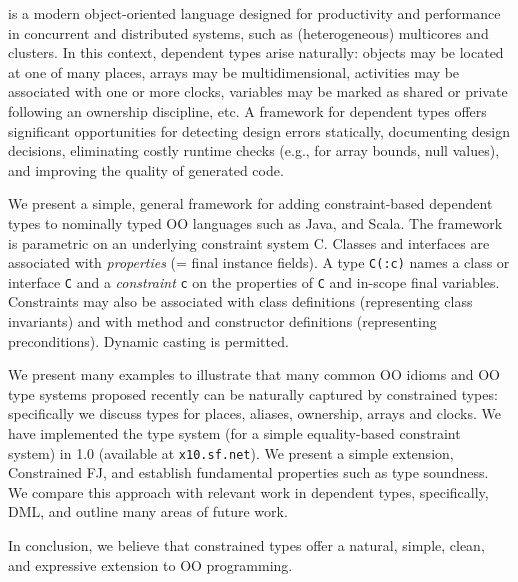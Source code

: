 \Xten{} is a modern object-oriented language designed for productivity
and performance in concurrent and distributed systems, such as
(heterogeneous) multicores and clusters. In this context, dependent
types arise naturally: objects may be located at one of many places,
arrays may be multidimensional, activities may be associated with one
or more clocks, variables may be marked as shared or private following
an ownership discipline, etc.  A framework for dependent types offers
significant opportunities for detecting design errors statically,
documenting design decisions, eliminating costly runtime checks
(e.g., for array bounds, null values), and improving the quality of
generated code.

We present a simple, general framework for adding constraint-based
dependent types to nominally typed OO languages such as Java, \Xten{}
and Scala. The framework is parametric on an underlying constraint
system {\cal C}. Classes and interfaces are associated with {\em
properties} (= final instance fields). A type {\tt C(:c)} names a class
or interface {\tt C} and a {\em constraint} {\tt c} on the
properties of {\tt C} and in-scope final variables.  Constraints
may also be associated with class definitions (representing
class invariants) and with method and constructor definitions
(representing preconditions). Dynamic casting is permitted.

We present many examples to illustrate that many common OO idioms and
OO type systems proposed recently can be naturally captured by
constrained types: specifically we discuss types for places, aliases,
ownership, arrays and clocks. We have implemented the type system (for
a simple equality-based constraint system) in \Xten{} 1.0 (available
at {\tt x10.sf.net}). We present a simple \FJ{} extension,
Constrained FJ, and establish fundamental properties such as type
soundness. We compare this approach with relevant work in dependent
types, specifically, DML, and outline many areas of future work.

In conclusion, we believe that constrained types offer a natural,
simple, clean, and expressive extension to OO programming.
